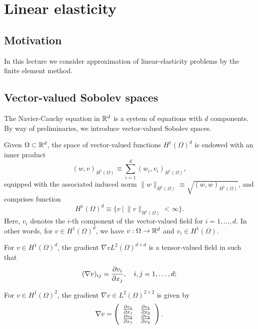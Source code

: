 \chapter{Linear elasticity}

\section{Motivation}
In this lecture we consider approximation of linear-elasticity problems by the finite element method.

\section{Vector-valued Sobolev spaces}
The Navier-Cauchy equation in $\RR^d$ is a system of equations with $d$ components. By way of preliminaries, we introduce vector-valued Sobolev spaces.
\begin{definition}
  Given $\Omega \subset \RR^d$, the space of vector-valued functions $H^1(\Omega)^d$ is endowed with an inner product
  \begin{equation*}
    (w,v)_{H^1(\Omega)} \equiv \sum_{i=1}^d (w_i,v_i)_{H^1(\Omega)},
  \end{equation*}
  equipped with the associated induced norm $\| w \|_{H^1(\Omega)} \equiv \sqrt{(w,w)_{H^1(\Omega)}}$, and comprises function
  \begin{equation*}
    H^1(\Omega)^d \equiv \{ v \ | \ \| v \|_{H^1(\Omega)} < \infty \}.
  \end{equation*}
  Here, $v_i$ denotes the $i$-th component of the vector-valued field for $i = 1,\dots,d$. In other words, for $v \in H^1(\Omega)^d$, we have $v: \Omega \to \RR^d$ and $v_i \in H^1(\Omega)$.
\end{definition}
\begin{definition}
  For $v \in H^1(\Omega)^d$, the gradient $\nabla v L^2(\Omega)^{d \times d}$ is a tensor-valued field in such that
\begin{equation*}
  (\nabla v)_{ij} = \pp{v_i}{x_j}, \quad i,j = 1,\dots,d;
\end{equation*}
\end{definition}
\begin{corollary}
  For $v \in H^1(\Omega)^2$, the gradient $\nabla v \in L^2(\Omega)^{2 \times 2}$ is given by
\begin{equation*}
  \nabla v = \bmat{cc}
  \pp{v_1}{x_1} & \pp{v_1}{x_2} \\
  \pp{v_2}{x_1} & \pp{v_2}{x_2}
  \emat.
\end{equation*}
\end{corollary}
